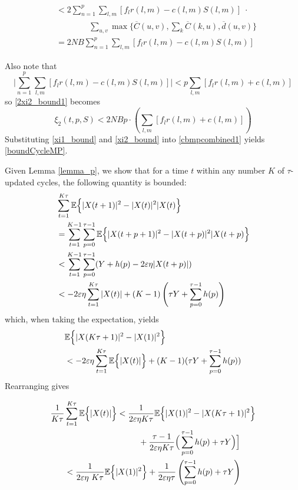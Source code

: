 \begin{IEEEproof}
\begin{small}
\begin{align}
&< 2 \sum_{n=1}^{p}  \sum_{l,m}[f_{l}r(l,m) - c(l,m)S(l,m)] \; \cdot \\ \nonumber
&\qquad \qquad \sum_{u,v} \max\Big\{  \overline{C}(u,v), \sum_{k}\overline{C}(k,u), \overline{d}(u,v)\Big\} \\
& = 2NB \sum_{n=1}^{p}  \sum_{l,m}[f_{l}r(l,m) - c(l,m)S(l,m)] \label{2xi2_bound1}
\end{align}
\end{small}Also note that 
\begin{equation*}
\Big| \sum_{n=1}^{p}  \sum_{l,m}[f_{l}r(l,m) - c(l,m)S(l,m)] \Big| < p \sum_{l,m}[f_{l}r(l,m) + c(l,m)]
\end{equation*}
so \eqref{2xi2_bound1} becomes
\begin{equation} \label{xi2_bound}
\xi_2(t,p,S) < 2 NB p \cdot \left( \sum_{l,m}[f_{l}r(l,m) + c(l,m)]\right)
\end{equation}
Substituting \eqref{xi1_bound} and \eqref{xi2_bound} into \eqref{cbmpcombined1} yields \eqref{boundCycleMP}.
\end{IEEEproof}
Given Lemma \ref{lemma_p}, we show that for a time $t$ within any number $K$ of $\tau$-updated cycles, the following quantity is bounded:
\begin{align} \nonumber 
&\sum_{t = 1}^{K \tau} \expectation{\vert X(t + 1)\vert^2 - \vert X(t)\vert^2 \vert X(t)}\\ \nonumber
&=\sum_{t=1}^{K-1} \sum_{p=0 }^{\tau - 1} \expectation{\vert X(t + p + 1)\vert^2 - \vert X(t + p)\vert^2 \vert X(t + p)}\\ \nonumber
&< \sum_{t=1}^{K-1} \sum_{p=0 }^{\tau - 1} (Y+ h(p) -2\varepsilon\eta \vert X(t + p )\vert ) \\
&< -2\varepsilon \eta \sum_{t=1}^{K \tau} \vert X(t )\vert  + (K - 1) \left(\tau Y+\sum_{p=0 }^{\tau - 1} h(p) \right) \label{equivalencestabcycleMP}
\end{align}
which, when taking the expectation, yields
\begin{align} \nonumber 
& \mathbb{E}\Big\{ \vert X(K \tau + 1)\vert^2 - \vert X(1)\vert^2  \Big\} \\
& <  -2\varepsilon\eta \sum_{t=1}^{K \tau} \mathbb{E}\Big\{ \vert X(t )\vert \Big\}+ (K - 1) ( \tau Y+\sum_{p=0 }^{\tau - 1} h(p) )
\end{align}
Rearranging gives
\begin{small}
\begin{align} \nonumber 
\dfrac{1}{K \tau}& \sum_{t=1}^{K \tau}  \mathbb{E}\Big\{ \vert X(t )\vert \Big\} < \frac{1}{2\varepsilon\eta K \tau} \mathbb{E}\Big\{ \vert X(1)\vert^2 - \vert X(K \tau + 1)\vert^2   \Big\} \\
&  \qquad \qquad \qquad \qquad \quad + \frac{\tau-1}{2\varepsilon\eta K\tau }   \Big(\sum_{p=0 }^{\tau - 1} h(p) + \tau Y \Big) \Big] \\
&< \dfrac{1}{2\varepsilon\eta\ K \tau}\mathbb{E}\Big\{ \vert X( 1)\vert^2 \Big\} + \dfrac{ 1}{2\varepsilon\eta \tau} \left(\sum_{p=0 }^{\tau - 1} h(p) + \tau Y\right)
\end{align}
\end{small}
